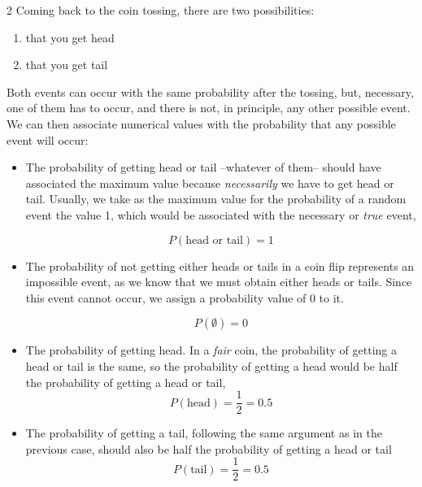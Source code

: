 \begin{paracol}{2}
Coming back to the coin tossing, there are two possibilities:
\begin{enumerate}
\item that you get head
\item that you get tail
\end{enumerate} 

Both events can occur with the same probability after the tossing, but, necessary, one of them has to occur, and there is not, in principle, any other possible event. We can then associate numerical values with the probability that any possible event will occur:

\begin{itemize}
	\item The probability of getting head or tail --whatever of them-- should have associated the maximum value because \emph{necessarily} we have to get head or tail. Usually, we take as the maximum value for the probability of a random event the value 1, which would be associated with the necessary or \emph{true} event,
	
\begin{equation*}
	P(\text{head or tail}) = 1
\end{equation*}

\item The probability of not getting either heads or tails in a coin flip represents an impossible event, as we know that we must obtain either heads or tails. Since this event cannot occur, we assign a probability value of 0 to it.

\begin{equation*}
	P(\emptyset) = 0
\end{equation*}

\item The probability of getting head. In a \emph{fair} coin, the probability of getting a head or tail is the same, so the probability of getting a head would be half the probability of getting a head or tail,
\begin{equation*}
	P(\text{head})=\frac{1}{2}=0.5
\end{equation*}

\item The probability of getting a tail, following the same argument as in the previous case, should also be half the probability of getting a head or tail
\begin{equation*}
	P(\text{tail})=\frac{1}{2}=0.5
\end{equation*} 
\end{itemize} 

\end{paracol}

